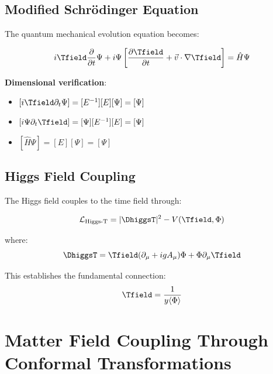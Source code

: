 	\subsection{Modified Schrödinger Equation}
	\label{subsec:modified_schrodinger}
	
	The quantum mechanical evolution equation becomes:
	
	\begin{equation}
		i \Tfield \frac{\partial}{\partial t} \Psi + i \Psi \left[\frac{\partial \Tfield}{\partial t} + \vec{v} \cdot \nabla \Tfield\right] = \hat{H} \Psi
		\label{eq:modified_schrodinger}
	\end{equation}
	
	\textbf{Dimensional verification}:
	\begin{itemize}
		\item $[i \Tfield \partial_t \Psi] = [E^{-1}][E][\Psi] = [\Psi]$
		\item $[i \Psi \partial_t \Tfield] = [\Psi][E^{-1}][E] = [\Psi]$
		\item $[\hat{H} \Psi] = [E][\Psi] = [\Psi]$ \checkmark
	\end{itemize}
	
	\subsection{Higgs Field Coupling}
	\label{subsec:higgs_coupling}
	
	The Higgs field couples to the time field through:
	
	\begin{equation}
		\mathcal{L}_{\text{Higgs-T}} = |\DhiggsT|^2 - V(\Tfield, \Phi)
		\label{eq:higgs_time_coupling}
	\end{equation}
	
	where:
	\begin{equation}
		\DhiggsT = \Tfield (\partial_\mu + ig A_\mu) \Phi + \Phi \partial_\mu \Tfield
		\label{eq:higgs_connection}
	\end{equation}
	
	This establishes the fundamental connection:
	\begin{equation}
		\Tfield = \frac{1}{y\langle\Phi\rangle}
		\label{eq:time_higgs_relation}
	\end{equation}
	
	\section{Matter Field Coupling Through Conformal Transformations}
	\label{sec:matter_coupling}
	

